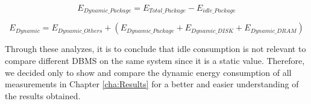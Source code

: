 \begin{equation}
E_{Dynamic\_Package} =  E_{Total\_Package} - E_{idle\_Package}
\end{equation}$
$

\begin{equation}
\label{eq:DDYNAMICpackage}
E_{Dynamic} = E_{Dynamic\_Others} + ( E_{Dynamic\_Package} + E_{Dynamic\_DISK} + E_{Dynamic\_DRAM})
\end{equation}$
$

Through these analyzes, it is to conclude that idle consumption is not relevant to compare different DBMS on the same system since it is a static value. Therefore, we decided only to show and compare the dynamic energy consumption of all measurements in Chapter \ref{cha:Results}  for a better and easier understanding of the results obtained. 
